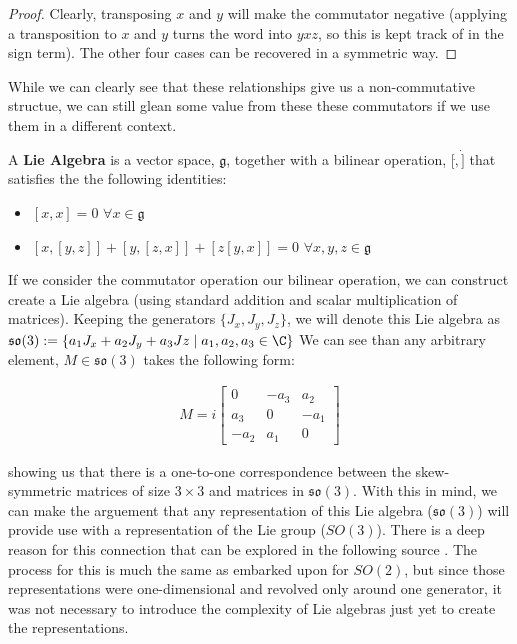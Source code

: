 \begin{proof}
Clearly, transposing $x$ and $y$ will make the commutator negative (applying a transposition to $x$ and $y$ turns the word into $yxz$, so this is kept track of in the sign term). The other four cases can be recovered in a symmetric way. \end{proof}

While we can clearly see that these relationships give us a non-commutative structue, we can still glean some value from these these commutators if we use them in a different context.

\begin{definition}
	A \textbf{Lie Algebra} is a vector space, $\mathfrak{g}$, together with a bilinear operation, $[\dot,\dot]$ that satisfies the the following identities:
\begin{itemize}
	\item$ [x,x] = 0$  $\forall x\in\mathfrak{g}$
	\item $[x,[y,z]] + [y,[z,x]] + [z[y,x]]= 0 $ $\forall x,y,z\in\mathfrak{g}$
\end{itemize}
\end{definition}

If we consider the commutator operation our bilinear operation, we can construct create a Lie algebra (using standard addition and scalar multiplication of matrices). Keeping the generators $\{J_x,J_y,J_z\}$, we will denote this Lie algebra as $\mathfrak{so}(3) := \{a_1J_x + a_2J_y + a_3Jz \mid a_1,a_2,a_3\in\C\}$ We can see than any arbitrary element, $M\in \mathfrak{so}(3)$ takes the following form:

\begin{equation}
	\begin{aligned}
		M=i\begin{bmatrix}
		0 & -a_3 & a_2 \\
		 a_3 & 0 & -a_1\\
		-a_2 & a_1 & 0
		\end{bmatrix}
	\end{aligned}
\end{equation} 

showing us that there is a one-to-one correspondence between the skew-symmetric matrices of size $3\times 3$ and matrices in $\mathfrak{so}(3)$. With this in mind, we can make the arguement that any representation of this Lie algebra ($\mathfrak{so}(3)$) will provide use with a representation of the Lie group ($SO(3)$). There is a deep reason for this connection that can be explored in the following source \cite{Hall}. The process for this is much the same as embarked upon for $SO(2)$, but since those representations were one-dimensional and revolved only around one generator, it was not necessary to introduce the complexity of Lie algebras just yet to create the representations. 

